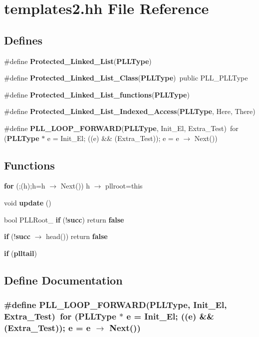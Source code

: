 \section{templates2.hh File Reference}
\label{templates2_8hh}
\subsection*{Defines}
\begin{CompactItemize}
\item 
\#define {\bf Protected\_\-Linked\_\-List}({\bf PLLType})
\item 
\#define {\bf Protected\_\-Linked\_\-List\_\-Class}({\bf PLLType})\ public PLL\_\-PLLType
\item 
\#define {\bf Protected\_\-Linked\_\-List\_\-functions}({\bf PLLType})
\item 
\#define {\bf Protected\_\-Linked\_\-List\_\-Indexed\_\-Access}({\bf PLLType}, Here, There)
\item 
\#define {\bf PLL\_\-LOOP\_\-FORWARD}({\bf PLLType}, Init\_\-El, Extra\_\-Test)\ for ({\bf PLLType} $\ast$ e = Init\_\-El; ((e) \&\& (Extra\_\-Test)); e = e $\rightarrow$ Next())
\end{CompactItemize}
\subsection*{Functions}
\begin{CompactItemize}
\item 
{\bf for} (;(h);h=h $\rightarrow$ Next()) h $\rightarrow$ pllroot=this
\item 
void {\bf update} ()
\item 
bool PLLRoot\_\- {\bf if} (!{\bf succ}) return {\bf false}
\item 
{\bf if} (!{\bf succ} $\rightarrow$ head()) return {\bf false}
\item 
{\bf if} ({\bf plltail})
\end{CompactItemize}


\subsection{Define Documentation}
\subsubsection{\setlength{\rightskip}{0pt plus 5cm}\#define PLL\_\-LOOP\_\-FORWARD({\bf PLLType}, Init\_\-El, Extra\_\-Test)\ for ({\bf PLLType} $\ast$ e = Init\_\-El; ((e) \&\& (Extra\_\-Test)); e = e $\rightarrow$ Next())}\label{templates2_8hh_a4}


